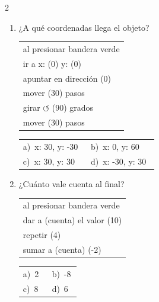 \documentclass[11pt,a4paper]{article}
\begin{document}
\begin{multicols}{2}
\begin{enumerate}[label=\textbf{\arabic*.},leftmargin=*,itemsep=10pt,topsep=0pt]
\item \begin{minipage}[t]{\linewidth}
¿A qué coordenadas llega el objeto?
\par\vspace{3pt}\hspace*{1em}\begin{tabular}{@{}l@{}}\ttfamily\small al presionar bandera verde \\
\ttfamily\small ir a x: (0) y: (0) \\
\ttfamily\small apuntar en dirección (0) \\
\ttfamily\small mover (30) pasos \\
\ttfamily\small girar $\circlearrowleft$ (90) grados \\
\ttfamily\small mover (30) pasos
\end{tabular}\par

\vspace{4pt}
\begin{tabular}{@{}p{0.47\linewidth}p{0.47\linewidth}@{}}
a)~x: 30, y: -30 & b)~x: 0, y: 60 \\
c)~x: 30, y: 30 & d)~x: -30, y: 30 \\
\end{tabular}
\end{minipage}

\item \begin{minipage}[t]{\linewidth}
¿Cuánto vale cuenta al final?
\par\vspace{3pt}\hspace*{1em}\begin{tabular}{@{}l@{}}\ttfamily\small al presionar bandera verde \\
\ttfamily\small dar a (cuenta) el valor (10) \\
\ttfamily\small repetir (4) \\
\ttfamily\small \hspace*{1.5em}sumar a (cuenta) (-2)
\end{tabular}\par

\vspace{4pt}
\begin{tabular}{@{}p{0.47\linewidth}p{0.47\linewidth}@{}}
a)~2 & b)~-8 \\
c)~8 & d)~6 \\
\end{tabular}
\end{minipage}


\end{enumerate}
\end{multicols}
\end{document}
